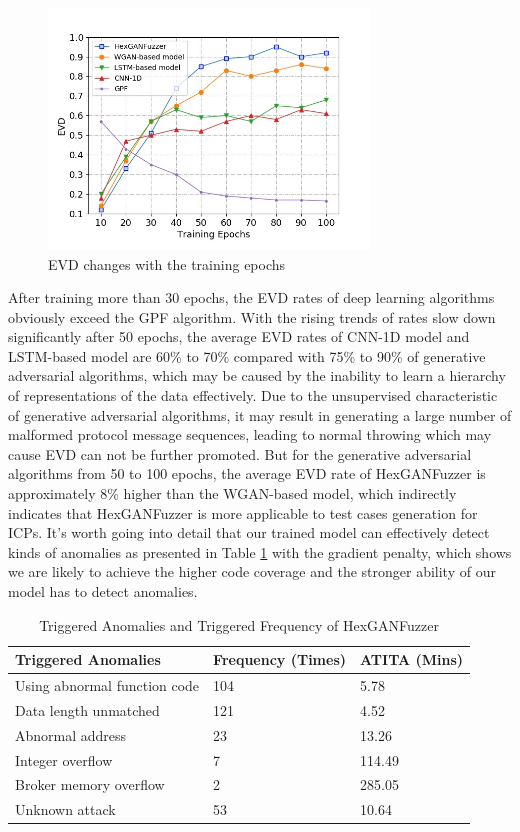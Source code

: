 \begin{figure}[htbp]
	\centering
	\includegraphics[width=3.36in]{FIGURE_EVD.jpg}
	\caption{EVD changes with the training epochs}
	\label{FIGURE_EVD}
\end{figure}
After training more than 30 epochs, the EVD rates of deep learning algorithms obviously exceed the GPF algorithm. With the rising trends of rates slow down significantly after 50 epochs, the average EVD rates of CNN-1D model and LSTM-based model are 60\% to 70\% compared with 75\% to 90\% of generative adversarial algorithms, which may be caused by the inability to learn a hierarchy of representations of the data effectively. Due to the unsupervised characteristic of generative adversarial algorithms, it may result in generating a large number of malformed protocol message sequences, leading to normal throwing which may cause EVD can not be further promoted. But for the generative adversarial algorithms from 50 to 100 epochs, the average EVD rate of HexGANFuzzer is approximately 8\% higher than the WGAN-based model, which indirectly indicates that HexGANFuzzer is more applicable to test cases generation for ICPs. It's worth going into detail that our trained model can effectively detect kinds of anomalies as presented in Table \ref{Triggered_Anomalies_HexGANFuzzer} with the gradient penalty, which shows we are likely to achieve the higher code coverage and the stronger ability of our model has to detect anomalies.
\begin{table}[htbp]
	\caption{Triggered Anomalies and Triggered Frequency of HexGANFuzzer}
	\label{Triggered_Anomalies_HexGANFuzzer}
	\centering
	\begin{tabular}{m{100pt}<{\centering}  m{40pt}<{\centering} m{50pt}<{\centering} }
		\toprule
		\bfseries Triggered Anomalies &  \bfseries Frequency (Times) & \bfseries ATITA (Mins)\\
		\midrule
		Using abnormal function code & 104 & 5.78\\
		Data length unmatched & 121 & 4.52\\
		Abnormal address & 23 &13.26\\
		Integer overflow & 7 & 114.49 \\
		Broker memory overflow & 2 & 285.05 \\
		Unknown attack & 53 &10.64\\
		\bottomrule
	\end{tabular}
\end{table}

